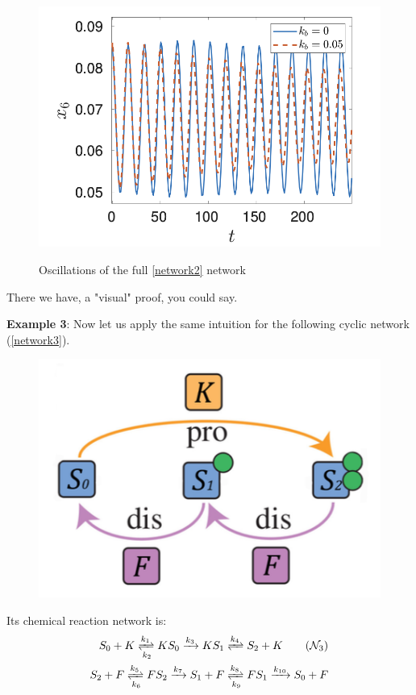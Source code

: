 \begin{figure}[H]
	\includegraphics[width=13cm]{math_pics/oscillations-full-network.png}
	\centering
	\label{fig:full_net_oscillations}
	\caption{Oscillations of the full \ref{network2} network}
\end{figure}

There we have, a "visual" proof, you could say.

\hfill\break
\hfill\break

\textbf{Example 3}:
Now let us apply the same intuition for the following cyclic network (\ref{network3}).

\begin{figure}[H]
	\includegraphics[width=13cm]{math_pics/ex3-bifurcations.png}
	\centering
\end{figure}

Its chemical reaction network is:
\begin{align}\label{network3}
	S_{0} + K \xrightleftharpoons[ k_2 ]{k_1} KS_{0} \xrightarrow{k_3} K S_1 \xrightleftharpoons{k_4} S_2 + K \tag{$\mathcal{N}_3$} \\
	S_{2} + F \xrightleftharpoons[ k_6 ]{k_5} FS_{2} \xrightarrow{k_7} S_1 + F \xrightleftharpoons[k_9]{k_8} FS_1 \xrightarrow{k_{10}} S_0 + F \notag
\end{align}

